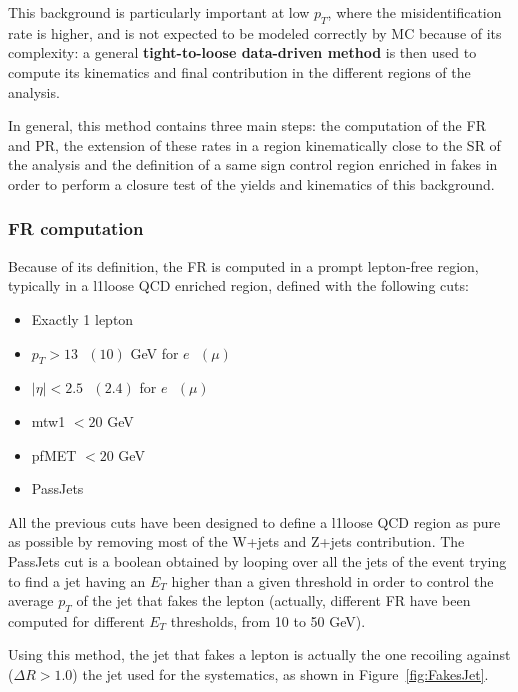 \documentclass[a4paper, 10pt, openright]{report}
\begin{document}
This background is particularly important at low $p_T$, where the misidentification rate is higher, and is not expected to be modeled correctly by \ac{MC} because of its complexity: a general \textbf{tight-to-loose data-driven method} is then used to compute its kinematics and final contribution in the different regions of the analysis. 

In general, this method contains three main steps: the computation of the \ac{FR} and \ac{PR}, the extension of these rates in a region kinematically close to the \ac{SR} of the analysis and the definition of a same sign control region enriched in fakes in order to perform a closure test of the yields and kinematics of this background.%

\subsubsection*{\acf{FR} computation}

Because of its definition, the \ac{FR} is computed in a prompt lepton-free region, typically in a l1loose \ac{QCD} enriched region, defined with the following cuts:
\begin{multicols}{2}
\begin{itemize}
\item Exactly 1 lepton
\item $p_{T} > 13 \text{ } (10)$ GeV for $e \text{ }(\mu)$ 
\item $|\eta| < 2.5 \text{ } (2.4)$ for $e \text{ }(\mu)$ 
\item mtw1 $< 20$ GeV
\item pf\ac{MET} $< 20$ GeV
\item PassJets
\end{itemize}
\end{multicols}

All the previous cuts have been designed to define a l1loose \ac{QCD} region as pure as possible by removing most of the W+jets and Z+jets contribution. The PassJets cut is a boolean obtained by looping over all the jets of the event trying to find a jet having an $E_T$ higher than a given threshold in order to control the average $p_T$ of the jet that fakes the lepton (actually, different \ac{FR} have been computed for different $E_T$ thresholds, from 10 to 50 GeV). 

Using this method, the jet that fakes a lepton is actually the one recoiling against ($\Delta R > 1.0$) the jet used for the systematics, as shown in Figure~\ref{fig:FakesJet}.
\end{document}
